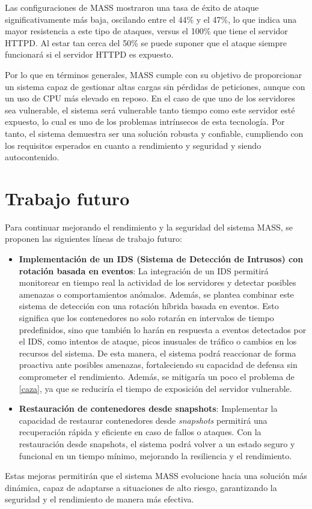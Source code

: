 Las configuraciones de MASS mostraron una tasa de éxito de ataque significativamente más baja, oscilando entre el 44\% y el 47\%, lo que indica una mayor resistencia a este tipo de ataques, versus el 100\% que tiene el servidor HTTPD. Al estar tan cerca del 50\% se puede suponer que el ataque siempre funcionará si el servidor HTTPD es expuesto.

Por lo que en términos generales, MASS cumple con su objetivo de proporcionar un sistema capaz de gestionar altas cargas sin pérdidas de peticiones, aunque con un uso de CPU más elevado en reposo. En el caso de que uno de los servidores sea vulnerable, el sistema será vulnerable tanto tiempo como este servidor esté expuesto, lo cual es uno de los problemas intrínsecos de esta tecnología. Por tanto, el sistema demuestra ser una solución robusta y confiable, cumpliendo con los requisitos esperados en cuanto a rendimiento y seguridad y siendo autocontenido.


\section{Trabajo futuro}
Para continuar mejorando el rendimiento y la seguridad del sistema MASS, se proponen las siguientes líneas de trabajo futuro:
\begin{itemize}
    \item \textbf{Implementación de un IDS (Sistema de Detección de Intrusos) con rotación basada en eventos}: La integración de un IDS permitirá monitorear en tiempo real la actividad de los servidores y detectar posibles amenazas o comportamientos anómalos. Además, se plantea combinar este sistema de detección con una rotación híbrida basada en eventos. Esto significa que los contenedores no solo rotarán en intervalos de tiempo predefinidos, sino que también lo harán en respuesta a eventos detectados por el IDS, como intentos de ataque, picos inusuales de tráfico o cambios en los recursos del sistema. De esta manera, el sistema podrá reaccionar de forma proactiva ante posibles amenazas, fortaleciendo su capacidad de defensa sin comprometer el rendimiento. Además, se mitigaría un poco el problema de \ref{caza}, ya que se reduciría el tiempo de exposición del servidor vulnerable.
    \item \textbf{Restauración de contenedores desde snapshots}: Implementar la capacidad de restaurar contenedores desde \textit{snapshots} permitirá una recuperación rápida y eficiente en caso de fallos o ataques. Con la restauración desde snapshots, el sistema podrá volver a un estado seguro y funcional en un tiempo mínimo, mejorando la resiliencia y el rendimiento.
\end{itemize}

Estas mejoras permitirán que el sistema MASS evolucione hacia una solución más dinámica, capaz de adaptarse a situaciones de alto riesgo, garantizando la seguridad y el rendimiento de manera más efectiva.